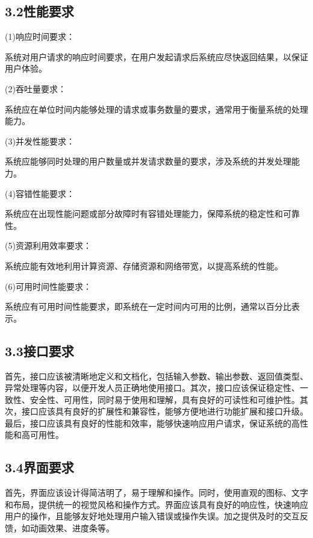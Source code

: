 \documentclass[24pt,a4paper]{article}%
\begin{document}
\subsection*{\songti 3.2性能要求}
\noindent (1)响应时间要求：\par 系统对用户请求的响应时间要求，在用户发起请求后系统应尽快返回结果，以保证用户体验。\par
\noindent (2)吞吐量要求：\par 系统应在单位时间内能够处理的请求或事务数量的要求，通常用于衡量系统的处理能力。\par
\noindent (3)并发性能要求：\par 系统应能够同时处理的用户数量或并发请求数量的要求，涉及系统的并发处理能力。\par
\noindent (4)容错性能要求：\par 系统应在出现性能问题或部分故障时有容错处理能力，保障系统的稳定性和可靠性。\par
\noindent (5)资源利用效率要求：\par 系统应能有效地利用计算资源、存储资源和网络带宽，以提高系统的性能。\par
\noindent (6)可用时间性能要求：\par 系统应有可用时间性能要求，即系统在一定时间内可用的比例，通常以百分比表示。\par
\subsection*{\songti 3.3接口要求}
首先，接口应该被清晰地定义和文档化，包括输入参数、输出参数、返回值类型、异常处理等内容，以便开发人员正确地使用接口。其次，接口应该保证稳定性、一致性、安全性、可用性，同时易于使用和理解，具有良好的可读性和可维护性。其次，接口应该具有良好的扩展性和兼容性，能够方便地进行功能扩展和接口升级。最后，接口应该具有良好的性能和效率，能够快速响应用户请求，保证系统的高性能和高可用性。
\subsection*{\songti 3.4界面要求}
首先，界面应该设计得简洁明了，易于理解和操作。同时，使用直观的图标、文字和布局，提供统一的视觉风格和操作方式。界面应该具有良好的响应性，快速响应用户的操作，且能够友好地处理用户输入错误或操作失误。加之提供及时的交互反馈，如动画效果、进度条等。
\newpage
\end{document}
